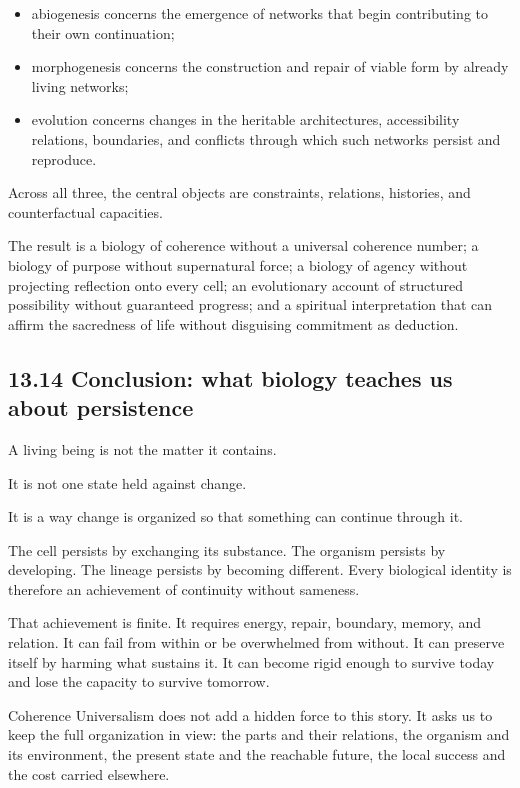 \documentclass[
  11pt,
]{article}
\providecommand{\tightlist}{%
  \setlength{\itemsep}{0pt}\setlength{\parskip}{0pt}}
\begin{document}
\begin{itemize}
\tightlist
\item
  abiogenesis concerns the emergence of networks that begin contributing
  to their own continuation;
\item
  morphogenesis concerns the construction and repair of viable form by
  already living networks;
\item
  evolution concerns changes in the heritable architectures,
  accessibility relations, boundaries, and conflicts through which such
  networks persist and reproduce.
\end{itemize}

Across all three, the central objects are constraints, relations,
histories, and counterfactual capacities.

The result is a biology of coherence without a universal coherence
number; a biology of purpose without supernatural force; a biology of
agency without projecting reflection onto every cell; an evolutionary
account of structured possibility without guaranteed progress; and a
spiritual interpretation that can affirm the sacredness of life without
disguising commitment as deduction.

\subsection{13.14 Conclusion: what biology teaches us about
persistence}\label{conclusion-what-biology-teaches-us-about-persistence}

A living being is not the matter it contains.

It is not one state held against change.

It is a way change is organized so that something can continue through
it.

The cell persists by exchanging its substance. The organism persists by
developing. The lineage persists by becoming different. Every biological
identity is therefore an achievement of continuity without sameness.

That achievement is finite. It requires energy, repair, boundary,
memory, and relation. It can fail from within or be overwhelmed from
without. It can preserve itself by harming what sustains it. It can
become rigid enough to survive today and lose the capacity to survive
tomorrow.

Coherence Universalism does not add a hidden force to this story. It
asks us to keep the full organization in view: the parts and their
relations, the organism and its environment, the present state and the
reachable future, the local success and the cost carried elsewhere.
\end{document}

